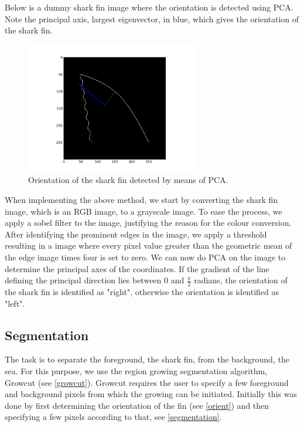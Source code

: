 \documentclass[a4paper,10pt]{article}
\begin{document}
Below is a dummy shark fin image where the orientation is detected using PCA. 
Note the principal axis, largest eigenvector, in blue, which gives the
orientation of the shark fin.

\begin{figure}[H]
 \centering
 \includegraphics[width=3in]{orientation.jpg}
 \caption{Orientation of the shark fin detected by means of PCA.}
 \label{orientation}
\end{figure}

When implementing the above method, we start by converting the shark fin image,
which is an RGB image, to a grayscale image.  To ease the process,
we apply a sobel filter to the image, justifying the reason for the colour
conversion.  After identifying the prominent edges in the image, we apply a 
threshold resulting in a image where every pixel value greater than the
geometric mean of the edge image times four is set to zero.  We can now do PCA
on
the image to determine the principal axes of the coordinates.  If the gradient
of the line defining the principal direction lies between 0 and $\frac{\pi}{2}$ 
radians, the orientation of the shark fin is identified as "right", otherwise
the orientation is identified as "left". 

\subsection{Segmentation}
The task is to separate the foreground, the shark fin, from the background, the
sea.  For this purpose, we use the region growing segmentation algorithm,
Growcut (see \ref{growcut}).  Growcut requires the user to specify a few
foreground and background pixels from which the growing can be initiated.  
Initially this was done by first determining the orientation of the fin (see
\ref{orient}) and then specifying a few pixels according to that, see 
\ref{segmentation}.  \\
\end{document}
